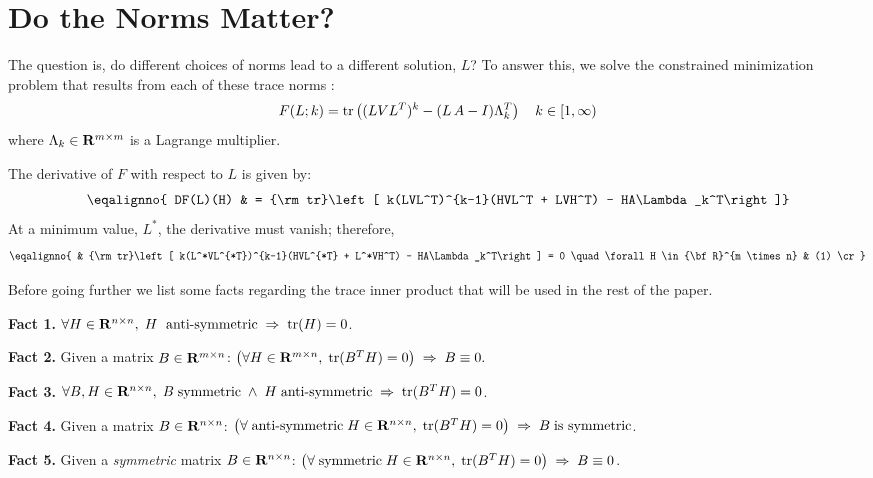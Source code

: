 \section{Do the Norms Matter?}
The question is, do different choices of norms lead to a different
solution, $L$? To answer this, we solve the constrained minimization
problem that results from each of these trace norms%
:
$$
F(L; k) = {\rm tr}\left((LVL^T)^k - (L\, A - I)\Lambda_{k}^T\right)
\quad k \in [1,\infty)
$$
where $\Lambda_k \in {\bf R}^{m \times m}$ is a Lagrange multiplier.%

The derivative of $F$ with respect to $L$ is given by:
$$
\eqalignno{
DF(L)(H) & = {\rm tr}\left[ k(LVL^T)^{k-1}(HVL^T + LVH^T) - 
HA\Lambda_k^T\right]}
$$
At a minimum value, $L^*$, the derivative must vanish; therefore,
$$
\eqalignno{
& {\rm tr}\left[ k(L^*VL^{*T})^{k-1}(HVL^{*T} + L^*VH^T) - 
HA\Lambda_k^T\right] = 0
  \quad \forall H \in {\bf R}^{m \times n} & (1) \cr}
$$

Before going further we list some facts regarding the trace inner product that 
will be used in the rest of the paper.

\item{{\bf Fact 1.} $\forall H \in {\bf R}^{n \times n},\; H \; \hbox{ anti-symmetric} \; \Rightarrow \; {\rm tr}(H) = 0$.}
\item{{\bf Fact 2.} Given a matrix $B \in {\bf R}^{m \times n}$:
$\bigl(\forall H \in {\bf R}^{m \times n},\; {\rm tr}(B^T H) = 0\bigr) \; \Rightarrow \; B \equiv 0.$}
\item{{\bf Fact 3.} $\forall B,H \in {\bf R}^{n \times n}, \;B \; {\rm symmetric} \; \wedge \; H \; \hbox{anti-symmetric}\;  \Rightarrow \; {\rm tr}(B^T H) = 0$.}
\item{{\bf Fact 4.} Given a matrix $B \in {\bf R}^{n \times n}$:
$\bigl(\forall \; \hbox{anti-symmetric} \; H \in {\bf R}^{n \times n}, \; {\rm tr}(B^T H) = 0\bigr) \; \Rightarrow \; B \; \hbox{is symmetric}$.}
\item{{\bf Fact 5.} Given a {\it symmetric\/} matrix $B \in {\bf R}^{n \times n}$:
$\bigl(\forall \; \hbox{symmetric} \; H \in {\bf R}^{n \times n}, \; {\rm tr}(B^T H) = 0\bigr) \; \Rightarrow \; B \equiv 0$.}


